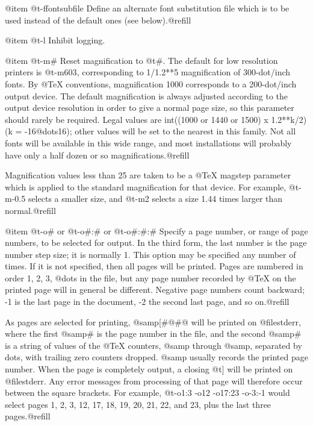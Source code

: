 @item @t{-ffontsubfile}
Define an alternate font substitution file which is to be
used instead of the default ones (see below).@refill

@item @t{-l}
Inhibit logging.

@item @t{-m#}
Reset magnification to @t{#}.  The default for low resolution
printers is @t{-m603}, corresponding to 1/1.2**5
magnification of 300-dot/inch fonts.  By @TeX{} conventions,
magnification 1000 corresponds to a 200-dot/inch output
device.  The default magnification is always adjusted
according to the output device resolution in order to give a
normal page size, so this parameter should rarely be
required.  Legal values are int((1000 or 1440 or 1500) x
1.2**{k/2}) (k = -16@dots{}16); other values will be set to
the nearest in this family.  Not all fonts will be available
in this wide range, and most installations will probably have
only a half dozen or so magnifications.@refill

Magnification values less than 25 are taken to be a
@TeX{} magstep parameter which is applied to the
standard magnification for that device.  For example,
@t{-m-0.5} selects a smaller size, and @t{-m2} selects a
size 1.44 times larger than normal.@refill

@item @t{-o#} or @t{-o#:#} or @t{-o#:#:#}
Specify a page number, or range of page numbers, to be
selected for output.  In the third form, the last number is
the page number step size; it is normally 1.  This option may
be specified any number of times.  If it is not specified,
then all pages will be printed.  Pages are numbered in order
1, 2, 3, @dots{} in the file, but any page number recorded
by @TeX{} on the printed page will in general be different.
Negative page numbers count backward; -1 is the last page in
the document, -2 the second last page, and so on.@refill

As pages are selected for printing, @samp{[#@{#@}} will be
printed on @file{stderr}, where the first @samp{#} is the
page number in the file, and the second @samp{#} is a string
of values of the @TeX{} counters, @samp{} through
@samp{}, separated by dots, with trailing zero
counters dropped.  @samp{} usually records the printed
page number.  When the page is completely output, a closing
@t{]} will be printed on @file{stderr}.  Any error messages
from processing of that page will therefore occur between the
square brackets.  For example, @t{-o1:3 -o12 -o17:23 -o-3:-1}
would select pages 1, 2, 3, 12, 17, 18, 19, 20, 21, 22, and
23, plus the last three pages.@refill

